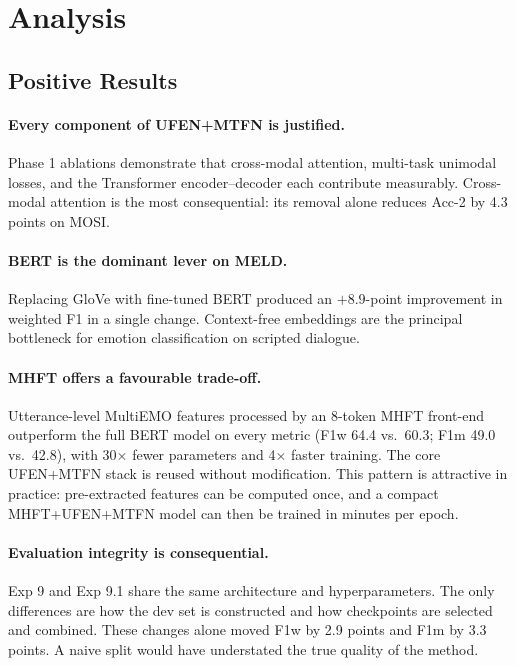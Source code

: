 \documentclass[11pt,twocolumn]{article}
\begin{document}
\section{Analysis}
\label{sec:analysis}

\subsection{Positive Results}

\paragraph{Every component of UFEN+MTFN is justified.} Phase 1 ablations demonstrate that cross-modal attention, multi-task unimodal losses, and the Transformer encoder--decoder each contribute measurably. Cross-modal attention is the most consequential: its removal alone reduces Acc-2 by 4.3 points on MOSI.

\paragraph{BERT is the dominant lever on MELD.} Replacing GloVe with fine-tuned BERT produced an $+8.9$-point improvement in weighted F1 in a single change. Context-free embeddings are the principal bottleneck for emotion classification on scripted dialogue.

\paragraph{MHFT offers a favourable trade-off.} Utterance-level MultiEMO features processed by an 8-token MHFT front-end outperform the full BERT model on every metric (F1w 64.4 vs.\ 60.3; F1m 49.0 vs.\ 42.8), with 30$\times$ fewer parameters and 4$\times$ faster training. The core UFEN+MTFN stack is reused without modification. This pattern is attractive in practice: pre-extracted features can be computed once, and a compact MHFT+UFEN+MTFN model can then be trained in minutes per epoch.

\paragraph{Evaluation integrity is consequential.} Exp 9 and Exp 9.1 share the same architecture and hyperparameters. The only differences are how the dev set is constructed and how checkpoints are selected and combined. These changes alone moved F1w by 2.9 points and F1m by 3.3 points. A naive split would have understated the true quality of the method.
\end{document}
